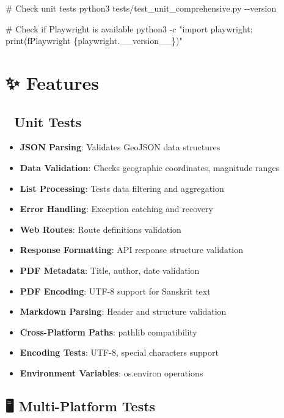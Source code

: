 \documentclass[
  11pt,
  oneside,
  openany]{scrbook}
\newenvironment{Shaded}{\begin{snugshade}}{\end{snugshade}}
\newcommand{\AttributeTok}[1]{\textcolor[rgb]{0.40,0.45,0.13}{#1}}
\newcommand{\CommentTok}[1]{\textcolor[rgb]{0.37,0.37,0.37}{#1}}
\newcommand{\ExtensionTok}[1]{\textcolor[rgb]{0.00,0.23,0.31}{#1}}
\newcommand{\NormalTok}[1]{\textcolor[rgb]{0.00,0.23,0.31}{#1}}
\newcommand{\StringTok}[1]{\textcolor[rgb]{0.13,0.47,0.30}{#1}}
\providecommand{\tightlist}{%
  \setlength{\itemsep}{0pt}\setlength{\parskip}{0pt}}\usepackage{longtable,booktabs,array}
\begin{document}
\begin{Shaded}
\begin{Highlighting}[]
\CommentTok{\# Check unit tests}
\ExtensionTok{python3}\NormalTok{ tests/test\_unit\_comprehensive.py }\AttributeTok{{-}{-}version}

\CommentTok{\# Check if Playwright is available}
\ExtensionTok{python3} \AttributeTok{{-}c} \StringTok{"import playwright; print(f\textquotesingle{}Playwright \{playwright.\_\_version\_\_\}\textquotesingle{})"}
\end{Highlighting}
\end{Shaded}

\section{✨ Features}\label{features}

\subsection{🔬 Unit Tests}\label{unit-tests}

\begin{itemize}
\tightlist
\item
  \textbf{JSON Parsing}: Validates GeoJSON data structures
\item
  \textbf{Data Validation}: Checks geographic coordinates, magnitude
  ranges
\item
  \textbf{List Processing}: Tests data filtering and aggregation
\item
  \textbf{Error Handling}: Exception catching and recovery
\item
  \textbf{Web Routes}: Route definitions validation
\item
  \textbf{Response Formatting}: API response structure validation
\item
  \textbf{PDF Metadata}: Title, author, date validation
\item
  \textbf{PDF Encoding}: UTF-8 support for Sanskrit text
\item
  \textbf{Markdown Parsing}: Header and structure validation
\item
  \textbf{Cross-Platform Paths}: pathlib compatibility
\item
  \textbf{Encoding Tests}: UTF-8, special characters support
\item
  \textbf{Environment Variables}: os.environ operations
\end{itemize}

\subsection{🖥️ Multi-Platform Tests}\label{multi-platform-tests}
\end{document}

